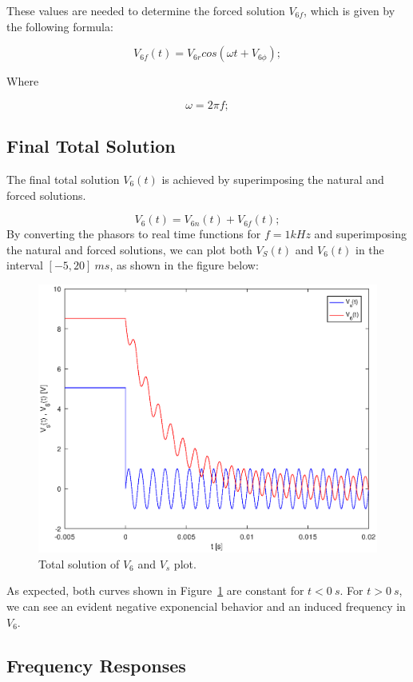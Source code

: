 These values are needed to determine the forced solution $V_{6f}$, which is given by the following formula:

\begin{equation}
V_{6f}(t)=V_{6r}cos(\omega t+V_{6\phi});
\end{equation}

Where

\begin{equation}
\omega=2\pi f;
\end{equation}


\subsection{Final Total Solution}


The final total solution $V_6(t)$ is achieved by superimposing the natural and forced solutions. 



\begin{equation}
	V_6(t)=V_{6n}(t)+V_{6f}(t);
\end{equation}
By converting the phasors to real time functions for $f = 1 kHz$ and superimposing the natural and forced solutions, we can plot both $V_S(t)$ and $V_6(t)$ in the interval $[-5, 20]~ms$, as shown in the figure below:


\begin{figure}[h] \centering
\includegraphics[width=0.7\linewidth]{total.eps}
\caption{Total solution of $V_{6}$ and $V_{s}$ plot.}
	\label{fig:total}
\end{figure}

As expected, both curves shown in Figure~\ref{fig:total} are constant for $t<0~s$. For $t>0~s$, we can see an evident negative exponencial behavior and an induced frequency in $V_{6}$.


\subsection{Frequency Responses}

